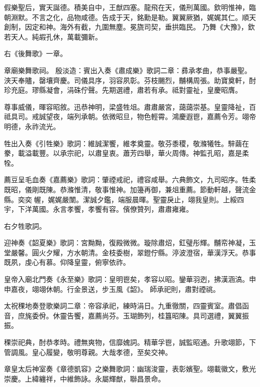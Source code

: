 \begin{pinyinscope}
 假樂聖后，實天誕德。積美自中，王猷四塞。龍飛在天，儀刑萬國。欽明惟神，臨朝淵默。不言之化，品物咸德。告成于天，銘勳是勒。翼翼厥猶，娓娓其仁。順天創制，因定和神。海外有截，九圍無塵。冕旒司契，垂拱臨民。
 乃舞《大豫》，欽若天人。純嘏孔休，萬載彌新。


右《後舞歌》一章。


章廟樂舞歌祠。
 殷淡造：賓出入奏《肅成樂》歌詞二章：彞承孝曲，恭事嚴聖。浹天奉贐，罄壤齊慶。司儀具序，羽容夙彰。芬枝颺烈，黼構周張。助寶奠軒，酎珍充庭。璆縣凝會，涓硃佇聲。先期選禮，肅若有承。祗對靈祉，皇慶昭膺。



 尊事威儀，暉容昭敘。迅恭神明，梁盛牲俎。肅肅嚴宮，藹藹崇基。皇靈降祉，百祗具司。戒誠望夜，端列承朝。依微昭旦，物色輕霄。鴻慶遐鬯，嘉薦令芳。翊帝明德，永祚流光。



 牲出入奏《引牲樂》歌詞：維誠潔饗，維孝奠靈。敬芬黍稷，敬滌犧牲。騂繭在豢，載溢載豐。以承宗祀，以肅皇衷。蕭芳四舉，華火周傳。神監孔昭，嘉是柔牷。



 薦豆呈毛血奏《嘉薦樂》歌詞：肇禋戒祀，禮容咸舉。六典飾文，九司昭序。牲柔既昭，儀剛既陳。恭滌惟清，敬事惟神。加籩再御，兼俎重薦。節動軒越，聲流金縣。奕奕幄，娓娓嚴闈。潔誠夕鑑，端服晨暉。聖靈戾止，翊我皇則。上綏四宇，下洋萬國。永言孝饗，孝饗有容。儐僚贊列，肅肅雍雍。



 右夕牲歌詞。



 迎神奏《韶夏樂》歌詞：宮黝黝，復殿微微。璇除肅炤，釭璧彤輝。黼帟神凝，玉堂嚴馨。圓火夕耀，方水朝清。金枝委樹，翠鐙佇縣。渟波澄宿，華漢浮天。恭事既夙，虔心有慕。仰降皇靈，俯寧依祚。



 皇帝入廟北門奏《永至樂》歌詞：皇明鬯矣，孝容以昭。鑾華羽迾，拂漢涵滈。申申嘉夜，翊翊休朝。行金景送，步玉風《韶》。
 師承祀則，肅對禋祧。



 太祝稞地奏登歌樂詞二章：帝容承祀，練時涓日。九重徹關，四靈賓室。肅倡函音，庶旄委佾。休靈告饗，嘉薦尚芬。玉瑚飾列，桂簋昭陳。具司選禮，翼翼振振。



 稞崇祀典，酎恭孝時。禮無爽物，信靡媿詞。精華孚鬯，誠監昭通。升歌翊節，下管調風。皇心履變，敬明尊親。大哉孝德，至矣交神。



 章皇太后神室奏《章德凱容》之樂舞歌詞：幽瑞浚靈，表彰嬪聖。翊載徽文，敷光崇慶。上緯纏祥，中維飾詠。永屬輝猷，聯昌景命。




\end{pinyinscope}
